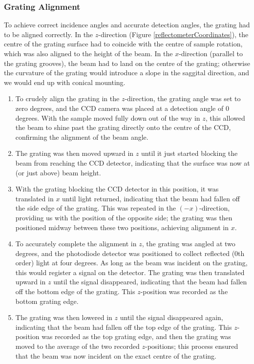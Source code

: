 \subsubsection{Grating Alignment}
To achieve correct incidence angles and accurate detection angles, the grating had to be aligned correctly.  In the $z$-direction (Figure \ref{reflectometerCoordinates}), the centre of the grating surface had to coincide with the centre of sample rotation, which was also aligned to the height of the beam.  In the $x$-direction (parallel to the grating grooves), the beam had to land on the centre of the grating; otherwise the curvature of the grating would introduce a slope in the saggital direction, and we would end up with conical mounting.
	\begin{enumerate}
	\item To crudely align the grating in the $z$-direction, the grating angle was set to zero degrees, and the CCD camera was placed at a detection angle of 0 degrees.  With the sample moved fully down out of the way in $z$, this allowed the beam to shine past the grating directly onto the centre of the CCD, confirming the alignment of the beam angle. 
	\item The grating was then moved upward in $z$ until it just started blocking the beam from reaching the CCD detector, indicating that the surface was now at (or just above) beam height.
	\item With the grating blocking the CCD detector in this position, it was translated in $x$ until light returned, indicating that the beam had fallen off the side edge of the grating.  This was repeated in the $(-x)$-direction, providing us with the position of the opposite side; the grating was then positioned midway between these two positions, achieving alignment in $x$.
	\item To accurately complete the alignment in $z$, the grating was angled at two degrees, and the photodiode detector was positioned to collect reflected (0th order) light at four degrees.  As long as the beam was incident on the grating, this would register a signal on the detector.  The grating was then translated upward in $z$ until the signal disappeared, indicating that the beam had fallen off the bottom edge of the grating. This $z$-position was recorded as the bottom grating edge.
	\item The grating was then lowered in $z$ until the signal disappeared again, indicating that the beam had fallen off the top edge of the grating.  This $z$-position was recorded as the top grating edge, and then the grating was moved to the average of the two recorded $z$-positions; this process ensured that the beam was now incident on the exact centre of the grating.
	\end{enumerate}
	
